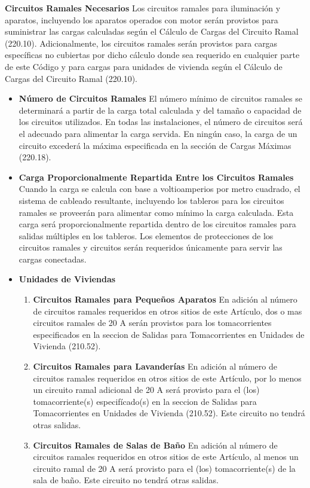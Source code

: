 \documentclass[11pt,letterpaper]{article}
\begin{document}
\newpage
\textbf{Circuitos Ramales Necesarios} Los circuitos ramales para iluminación y aparatos, incluyendo los aparatos operados con motor serán provistos para suministrar las cargas calculadas según el Cálculo de Cargas del Circuito Ramal (220.10). Adicionalmente, los circuitos ramales serán provistos para cargas específicas no cubiertas por dicho cálculo donde sea requerido en cualquier parte de este Código y para cargas para unidades de vivienda según el Cálculo de Cargas del Circuito Ramal (220.10).
\begin{itemize}
	\item \textbf{Número de Circuitos Ramales} El número mínimo de circuitos ramales se determinará a partir de la carga total calculada y del tamaño o capacidad de los circuitos utilizados. En todas las instalaciones, el número de circuitos será el adecuado para alimentar la carga servida. En ningún caso, la carga de un circuito excederá la máxima especificada en la sección de Cargas Máximas (220.18).

	\item \textbf{Carga Proporcionalmente Repartida Entre los Circui­tos Ramales} Cuando la carga se calcula con base a voltioamperios por metro cuadrado, el sistema de cableado resultante, incluyendo los tableros para los circuitos ramales se proveerán para alimentar como mínimo la carga calculada. Esta carga será proporcionalmente repartida dentro de los circuitos ramales para salidas múltiples en los tableros. Los elementos de protecciones de los circuitos ramales y circuitos serán requeridos únicamente para servir las cargas conectadas.

	\item \textbf{Unidades de Viviendas}
		\begin{enumerate}
			\item \textbf{Circuitos Ramales para Pequeños Aparatos} En adición al número de circuitos ramales requeridos en otros sitios de este Artículo, dos o mas circuitos ramales de 20 A serán provistos para los tomacorrientes especificados en la seccion de Salidas para Tomacorrientes en Unidades de Vivienda (210.52).
			\item \textbf{Circuitos Ramales para Lavanderías} En adición al número de circuitos ramales requeridos en otros sitios de este Artículo, por lo menos un circuito ramal adicional de 20 A será provisto para el (los) tomacorriente(s) especifícado(s) en la seccion de Salidas para Tomacorrientes en Unidades de Vivienda (210.52). Este circuito no tendrá otras salidas.
			\item \textbf{Circuitos Ramales de Salas de Baño} En adición al número de circuitos ramales requeridos en otros sitios de este Artículo, al menos un circuito ramal de 20 A será provisto para el (los) tomacorriente(s) de la sala de baño. Este circuito no tendrá otras salidas.
		\end{enumerate}
\end{itemize}
\end{document}

